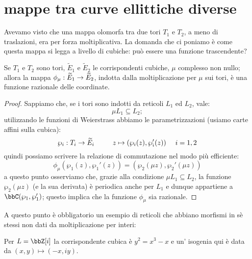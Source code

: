 \section{mappe tra curve ellittiche diverse}
Avevamo visto che una mappa olomorfa tra due tori $T_1$ e $T_2$, a meno di traslazioni, era per forza moltiplicativa. La domanda che ci poniamo è come questa mappa si legga a livello di cubiche: può essere una funzione trascendente?
\begin{proposizione}
Se $T_1$ e $T_2$ sono tori, $\widetilde{E}_1$ e $\widetilde{E}_2$ le corrispondenti cubiche, $\mu$ complesso non nullo; allora la mappa $\phi_\mu:\widetilde{E}_1\rightarrow\widetilde{E}_2$, indotta dalla moltiplicazione per $\mu$ sui tori, è una funzione razionale delle coordinate.
\end{proposizione}
\begin{proof}
Sappiamo che, se i tori sono indotti da reticoli $L_1$ ed $L_2$, vale:
$$
\mu L_1\subseteq L_2;
$$
utilizzando le funzioni di Weierstrass abbiamo le parametrizzazioni (usiamo carte affini sulla cubica):
$$
\wp_i:T_i\rightarrow \widetilde{E}_i \qquad \ \ z \mapsto (\wp_i(z),\wp_i'(z))\ \ \ \ i=1,2
$$
quindi possiamo scrivere la relazione di commutazione nel modo più efficiente:
$$
\phi_\mu(\wp_1(z),\wp_1'(z))=(\wp_2(\mu z),\wp_2'(\mu z))
$$
a questo punto osserviamo che, grazie alla condizione $\mu L_1\subseteq L_2$, la funzione $\wp_2(\mu z)$ (e la sua derivata) è periodica anche per $L_1$ e dunque appartiene a $\bbC(\wp_1,\wp_1')$; questo implica che la funzione $\phi_\mu$ sia razionale.
\end{proof}
A questo punto è obbligatorio un esempio di reticoli che abbiano morfismi in sè stessi non dati da moltiplicazione per interi:
\begin{fatto}
Per $L=\bbZ[i]$ la corrispondente cubica è $y^2=x^3-x$ e un' isogenia qui è data da $(x,y)\mapsto (-x,iy)$.
\end{fatto}
